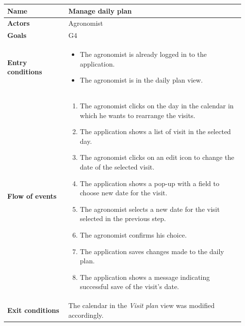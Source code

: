 \begin{table}[H]
    \centering
	\begin{tabular}{@{}p{0.25\linewidth} p{0.72\linewidth}@{}}
        \toprule
		\textbf{Name}               & Manage daily plan\\
		\midrule
		\textbf{Actors}             & Agronomist\\
		\midrule
		\textbf{Goals}              & G4 \\
		\midrule
		
		\textbf{Entry conditions}   & \begin{itemize}[leftmargin=.4cm,noitemsep,topsep=0pt,before=\vspace{-3mm},after=\vspace{-4mm}]
		    \item The agronomist is already logged in to the application.
		    \item The agronomist is in the daily plan view.
		\end{itemize}\\
		\midrule
		
		\textbf{Flow of events}     & \begin{enumerate}[leftmargin=.4cm,noitemsep,topsep=0pt,before=\vspace{-3mm},after=\vspace{-4mm}]
		    \item The agronomist clicks on the day in the calendar in which he wants to rearrange the visits.
		    \item The application shows a list of visit in the selected day.
		    \item The agronomist clicks on an edit icon to change the date of the selected visit.
		    \item The application shows a pop-up with a field to choose new date for the visit.
		    \item The agronomist selects a new date for the visit selected in the previous step.
		    \item The agronomist confirms his choice.
		    \item The application saves changes made to the daily plan.
		    \item The application shows a message indicating successful save of the visit's date.
		\end{enumerate}\\
		\midrule
		\textbf{Exit conditions}    & The calendar in the \textit{Visit plan} view was modified accordingly. \\
		\midrule
		

\end{tabular}
\end{table}
